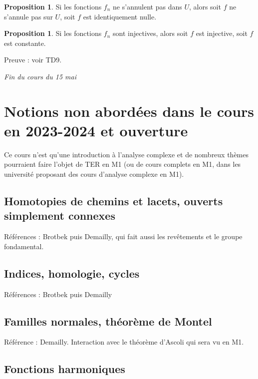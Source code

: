 \documentclass[11pt,a4paper]{book}
\theoremstyle{definition}
\newtheorem{proposition}[theoreme]{Proposition}
\theoremstyle{plain}
\begin{document}
\begin{proposition}
Si les fonctions $f_n$ ne s'annulent pas dans $U$, alors soit $f$ ne s'annule pas sur $U$, soit $f$ est identiquement nulle.
\end{proposition}

\begin{proposition}
Si les fonctions $f_n$ sont injectives, alors soit $f$ est injective, soit $f$ est constante.
\end{proposition}

Preuve : voir TD9.


\begin{center}
\hrulefill \emph{Fin du cours du 15 mai} \hrulefill
\end{center}





\section{Notions non abordées dans le cours en 2023-2024 et ouverture}

Ce cours n'est qu'une introduction à l'analyse complexe et de nombreux thèmes pourraient faire l'objet de TER en M1 (ou de cours complets en M1, dans les université proposant des cours d'analyse complexe en M1). 

\subsection{Homotopies de chemins et lacets, ouverts simplement connexes}

Références : Brotbek puis Demailly, qui fait aussi les revêtements et le groupe fondamental.

\subsection{Indices, homologie, cycles}

Références : Brotbek puis Demailly

\subsection{Familles normales, théorème de Montel}

Référence : Demailly. Interaction avec le théorème d'Ascoli qui sera vu en M1.

\subsection{Fonctions harmoniques}
\end{document}
